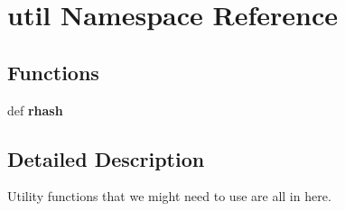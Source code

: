 \hypertarget{namespaceutil}{\section{util \-Namespace \-Reference}
\label{namespaceutil}
}
\subsection*{\-Functions}
\begin{DoxyCompactItemize}
\item 
\hypertarget{namespaceutil_a62acfd165dd6b184b5047db9881e8a58}{def {\bfseries rhash}}\label{namespaceutil_a62acfd165dd6b184b5047db9881e8a58}

\end{DoxyCompactItemize}


\subsection{\-Detailed \-Description}
\begin{DoxyVerb}Utility functions that we might need to use are all in here.\end{DoxyVerb}
 